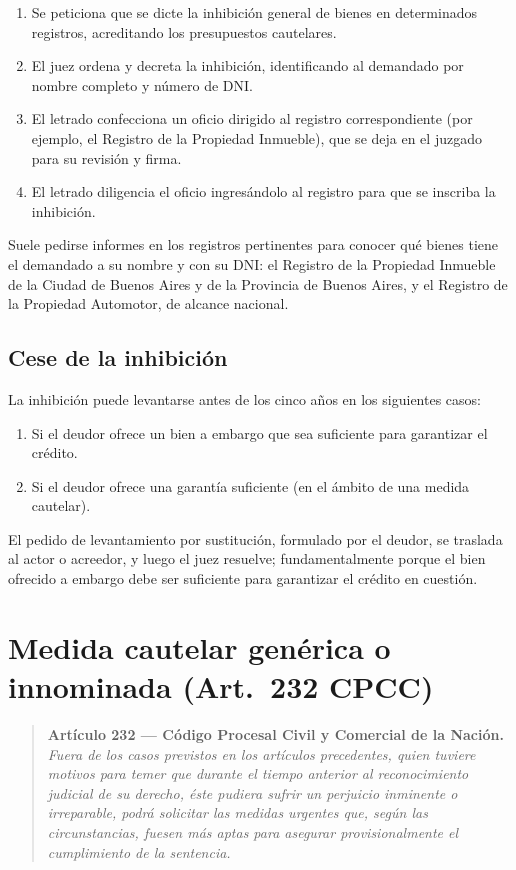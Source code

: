 \documentclass[12pt,oneside]{book}
\begin{document}
\begin{enumerate}
    \item Se peticiona que se dicte la inhibición general de bienes en determinados registros, acreditando los presupuestos cautelares.
    \item El juez ordena y decreta la inhibición, identificando al demandado por nombre completo y número de DNI.
    \item El letrado confecciona un oficio dirigido al registro correspondiente (por ejemplo, el Registro de la Propiedad Inmueble), que se deja en el juzgado para su revisión y firma.
    \item El letrado diligencia el oficio ingresándolo al registro para que se inscriba la inhibición.
\end{enumerate}

Suele pedirse informes en los registros pertinentes para conocer qué bienes tiene el demandado a su nombre y con su DNI: el Registro de la Propiedad Inmueble de la Ciudad de Buenos Aires y de la Provincia de Buenos Aires, y el Registro de la Propiedad Automotor, de alcance nacional.

\subsection{Cese de la inhibición}

La inhibición puede levantarse antes de los cinco años en los siguientes casos:

\begin{enumerate}
    \item Si el deudor ofrece un bien a embargo que sea suficiente para garantizar el crédito.
    \item Si el deudor ofrece una garantía suficiente (en el ámbito de una medida cautelar).
\end{enumerate}

El pedido de levantamiento por sustitución, formulado por el deudor, se traslada al actor o acreedor, y luego el juez resuelve; fundamentalmente porque el bien ofrecido a embargo debe ser suficiente para garantizar el crédito en cuestión.

\section{Medida cautelar genérica o innominada (Art.~232 CPCC)}

\begin{quote}
\small
\textbf{Artículo 232 --- Código Procesal Civil y Comercial de la Nación.} \textit{Fuera de los casos previstos en los artículos precedentes, quien tuviere motivos para temer que durante el tiempo anterior al reconocimiento judicial de su derecho, éste pudiera sufrir un perjuicio inminente o irreparable, podrá solicitar las medidas urgentes que, según las circunstancias, fuesen más aptas para asegurar provisionalmente el cumplimiento de la sentencia.}
\end{quote}
\end{document}
